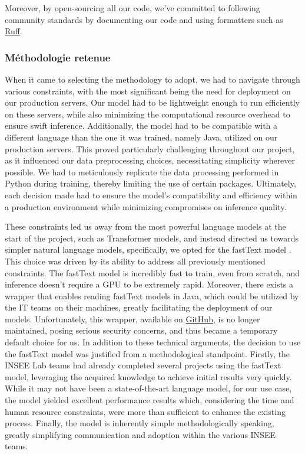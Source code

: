 Moreover, by open-sourcing all our code, we've committed to following community standards by documenting our code and using formatters such as \href{https://github.com/astral-sh/ruff}{Ruff}.


\subsubsection{Méthodologie retenue}

When it came to selecting the methodology to adopt, we had to navigate through various constraints, with the most significant being the need for deployment on our production servers. Our model had to be lightweight enough to run efficiently on these servers, while also minimizing the computational resource overhead to ensure swift inference. Additionally, the model had to be compatible with a different language than the one it was trained, namely Java, utilized on our production servers. This proved particularly challenging throughout our project, as it influenced our data preprocessing choices, necessitating simplicity wherever possible. We had to meticulously replicate the data processing performed in Python during training, thereby limiting the use of certain packages. Ultimately, each decision made had to ensure the model's compatibility and efficiency within a production environment while minimizing compromises on inference quality.

These constraints led us away from the most powerful language models at the start of the project, such as Transformer models, and instead directed us towards simpler natural language models, specifically, we opted for the fastText model \cite{joulin2016bag}. This choice was driven by its ability to address all previously mentioned constraints. The fastText model is incredibly fast to train, even from scratch, and inference doesn't require a GPU to be extremely rapid. Moreover, there exists a wrapper that enables reading fastText models in Java, which could be utilized by the IT teams on their machines, greatly facilitating the deployment of our models. Unfortunately, this wrapper, available on \href{https://github.com/vinhkhuc/JFastText}{GitHub}, is no longer maintained, posing serious security concerns, and thus became a temporary default choice for us. In addition to these technical arguments, the decision to use the fastText model was justified from a methodological standpoint. Firstly, the INSEE Lab teams had already completed several projects using the fastText model, leveraging the acquired knowledge to achieve initial results very quickly. While it may not have been a state-of-the-art language model, for our use case, the model yielded excellent performance results which, considering the time and human resource constraints, were more than sufficient to enhance the existing process. Finally, the model is inherently simple methodologically speaking, greatly simplifying communication and adoption within the various INSEE teams. 

